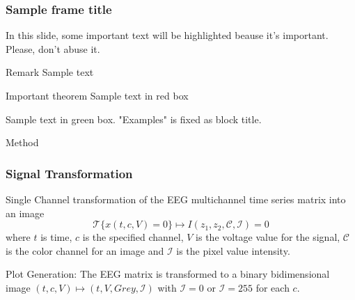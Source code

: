 \documentclass[aspectratio=169]{beamer}
\begin{document}
\begin{frame}
\frametitle{Sample frame title}
 
In this slide, some important text will be
\alert{highlighted} beause it's important.
Please, don't abuse it.
 
\begin{block}{Remark}
Sample text
\end{block}
 
\begin{alertblock}{Important theorem}
Sample text in red box
\end{alertblock}
 
\begin{examples}
Sample text in green box. "Examples" is fixed as block title.
\end{examples}
\end{frame}

    \begin{frame}
        \begin{center}
            \LARGE Method   
        \end{center}
    \end{frame}
    
    \begin{frame}
        \frametitle{Signal Transformation}
        \begin{center}           

Single Channel transformation of the EEG multichannel time series matrix into an image
\begin{equation}
\mathscr{T}\{x(t,c,V)=0\} \mapsto I(z_1,z_2, \mathcal{C}, \mathcal{I}) = 0
\end{equation}
where $ t $ is time, $ c $ is the specified channel, $ V $ is the voltage value for the signal, $ \mathcal{C} $ is the color channel for an image and  $ \mathcal{I} $ is the pixel value intensity.

\vspace{17pt}

Plot Generation: The EEG matrix is transformed to a binary bidimensional image $ (t,c,V) \mapsto (t, V, Grey, \mathcal{I}) $ with $\mathcal{I} = 0$ or  $\mathcal{I} = 255$ for each $ c $.

		\end{center}
	\end{frame}
	
\end{document}
